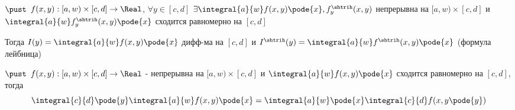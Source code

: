 \begin{proofs}
	$\pust$ $f(x,y): [a,w) \times [c,d] \to \Real$, $\forall y \in [c,d]$ $\exists
	\integral{a}{w}f(x,y)\pode{x}, f^{\shtrih}_{y}(x,y)$ непрерывна на $[a,w) \times [c,d]$ и
	$\integral{a}{w}f^{\shtrih}_{y}(x,y)\pode{x}$ сходится равномерно на $[c,d]$

	Тогда $I(y) = \integral{a}{w}f(x,y)\pode{x}$ дифф-ма на $[c,d]$ и $I^{\shtrih}(y)= \integral{a}{w}f^{\shtrih}(x,y)\pode{x}$ (формула лейбница)
\end{proofs}

\begin{proofs}
		$\pust$ $f(x,y): [a,w) \times [c,d] \to \Real$ - непрерывна на $[a,w) \times [c,d]$ и $\integral{a}{w}f(x,y)\pode{x}$ сходится равномерно на $[c,d]$, тогда
		$$\integral{c}{d}\pode{y}\integral{a}{w}f(x,y)\pode{x} = \integral{a}{w}\pode{x}\integral{c}{d}f(x,y\pode{y})$$
\end{proofs}
\newpage
